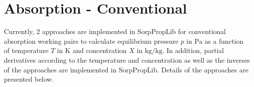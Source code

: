 \section{Absorption - Conventional}
\label{cha:abs:con}
%
Currently, 2 approaches are implemented in SorpPropLib for conventional absorption working pairs to calculate equilibrium pressure $p$ in $\si{\pascal}$ as a function of temperature $T$ in $\si{\kelvin}$ and concentration $X$ in $\si{\kilogram\per\kilogram}$. In addition, partial derivatives according to the temperature and concentration as well as the inverses of the approaches are implemented in SorpPropLib. Details of the approaches are presented below.
